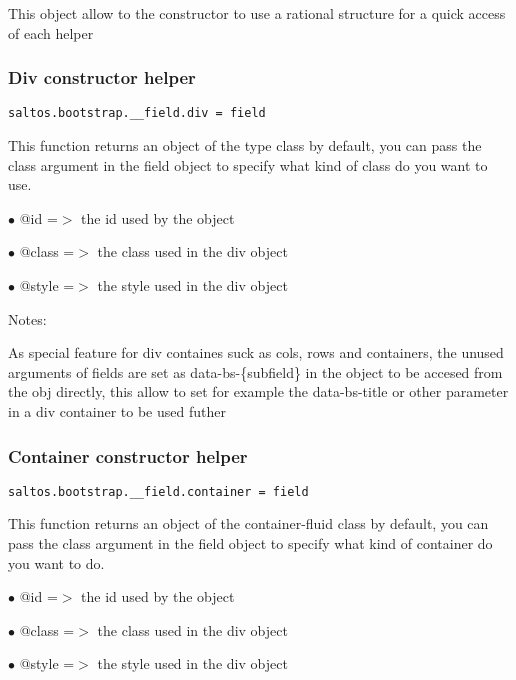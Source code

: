 \documentclass[a4paper]{article}
\begin{document}
This object allow to the constructor to use a rational structure for a quick access of each helper

\hypertarget{toc603}{}
\subsubsection{Div constructor helper}

\begin{lstlisting}
saltos.bootstrap.__field.div = field
\end{lstlisting}

This function returns an object of the type class by default, you can pass the class
argument in the field object to specify what kind of class do you want to use.

\begin{compactitem}
\item[\color{myblue}$\bullet$] @id    =$>$ the id used by the object
\item[\color{myblue}$\bullet$] @class =$>$ the class used in the div object
\item[\color{myblue}$\bullet$] @style =$>$ the style used in the div object
\end{compactitem}

Notes:

As special feature for div containes suck as cols, rows and containers, the unused arguments of fields
are set as data-bs-\{subfield\} in the object to be accesed from the obj directly, this allow to set for
example the data-bs-title or other parameter in a div container to be used futher

\hypertarget{toc604}{}
\subsubsection{Container constructor helper}

\begin{lstlisting}
saltos.bootstrap.__field.container = field
\end{lstlisting}

This function returns an object of the container-fluid class by default, you can pass the class
argument in the field object to specify what kind of container do you want to do.

\begin{compactitem}
\item[\color{myblue}$\bullet$] @id    =$>$ the id used by the object
\item[\color{myblue}$\bullet$] @class =$>$ the class used in the div object
\item[\color{myblue}$\bullet$] @style =$>$ the style used in the div object
\end{compactitem}
\end{document}
